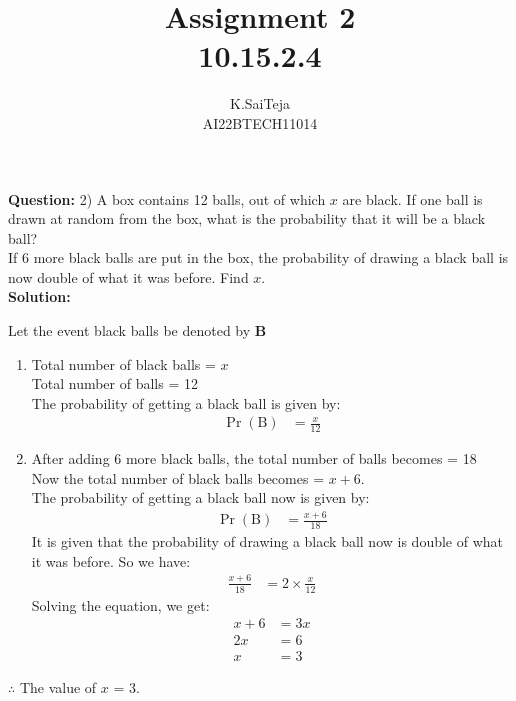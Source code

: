 \documentclass[journal,12pt,two column]{IEEEtran}
\title{Assignment 2 \\ 10.15.2.4}
\author{K.SaiTeja \\ AI22BTECH11014}
\providecommand{\pr}[1]{\ensuremath{\Pr\left(#1\right)}}
\newcommand{\question}{\noindent \textbf{Question: }}
\newcommand{\solution}{\noindent \textbf{Solution: }}
\begin{document}
\maketitle
\question 2)
A box contains 12 balls, out of which $x$ are black. If one ball is drawn at random from the box, what is the probability that it will be a black ball?\\ If 6 more black balls are put in the box, the probability of drawing a black ball is now double of what it was before. Find $x$.\\
\solution 
\begin{center}
Let the event black balls be denoted by \textbf B
\end{center}
\begin{enumerate}
  
    \item Total number of black balls = $x$\\
          Total number of balls = 12 \\
   The probability of getting a black ball is given by:
\begin{align}   
   \pr{\text{B}} &= \frac{x}{12} 
\end{align}  
  \item After adding 6 more black balls, the total number of balls becomes = 18 \\  
    Now the total number of black balls becomes = $x+6$.  \\
    The probability of getting a black ball now is given by:
\begin{align}  
  \pr{\text{B}} &= \frac{x+6}{18} 
\end{align}  
    It is given that the probability of drawing a black ball now is double of what it was before. So we have:    
\begin{align}
  \frac{x+6}{18} &= 2 \times \frac{x}{12}
\end{align}  
   Solving the equation, we get:
\begin{align}   
 x + 6 &= 3x \\
  2x &= 6 \\
  x &= 3
\end{align}
 
\end{enumerate}
\begin{center}
$\therefore$ The value of $x$ = 3.
\end{center}
\end{document}
